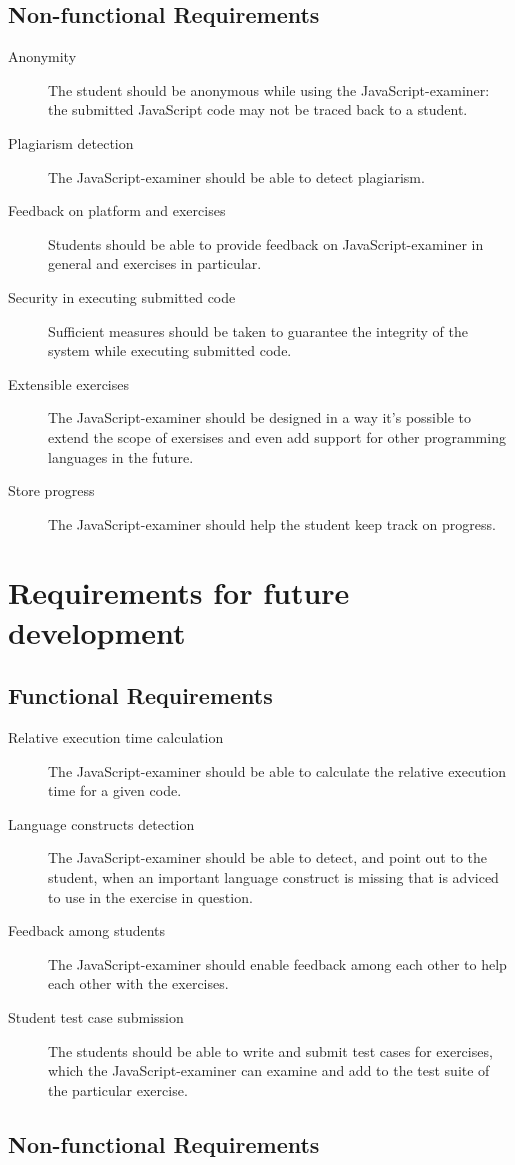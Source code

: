 \documentclass{article}
\begin{document}
\subsection{Non-functional Requirements}
\begin{description}
  \item[Anonymity] The student should be anonymous while using the
    JavaScript-examiner: the submitted JavaScript code may not be traced back
    to a student.
  \item[Plagiarism detection] The JavaScript-examiner should be able to detect
    plagiarism.
  \item[Feedback on platform and exercises] Students should be able to provide
    feedback on JavaScript-examiner in general and exercises in particular.
  \item[Security in executing submitted code] Sufficient measures should be
    taken to guarantee the integrity of the system while executing submitted
    code.
  \item[Extensible exercises] The JavaScript-examiner should be designed in a
    way it's possible to extend the scope of exersises and even add support for
    other programming languages in the future. 
  \item[Store progress] The JavaScript-examiner should help the student keep
    track on progress.
\end{description}


\section{Requirements for future development}
\subsection{Functional Requirements}
\begin{description}
  \item[Relative execution time calculation] The JavaScript-examiner should be 
    able to calculate the relative execution time for a given code.
  \item[Language constructs detection] The JavaScript-examiner should be able 
    to detect, and point out to the student, when an important language 
    construct is missing that is adviced to use in the exercise in question.
  \item[Feedback among students] The JavaScript-examiner should enable feedback
    among each other to help each other with the exercises. 
  \item[Student test case submission] The students should be able to write and
    submit test cases for exercises, which the JavaScript-examiner can examine
    and add to the test suite of the particular exercise.
\end{description}
\subsection{Non-functional Requirements}
\end{document}
